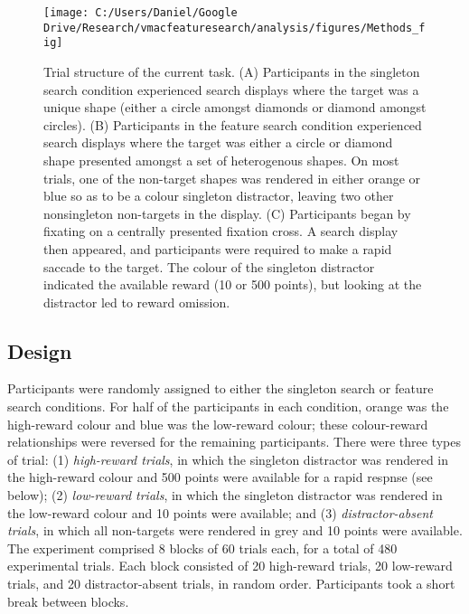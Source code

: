 \documentclass[jou, a4paper, noextraspace,floatsintext]{apa6}
\theoremstyle{definition}
\theoremstyle{definition}
\theoremstyle{definition}
\theoremstyle{remark}
\begin{document}
\begin{figure}

{\centering \texttt{[image: C:/Users/Daniel/Google Drive/Research/vmacfeaturesearch/analysis/figures/Methods\_fig]} 

}

\caption{Trial structure of the current task. (A) Participants in
the singleton search condition experienced search displays where the
target was a unique shape (either a circle amongst diamonds or diamond
amongst circles). (B) Participants in the feature search condition
experienced search displays where the target was either a circle or
diamond shape presented amongst a set of heterogenous shapes. On most
trials, one of the non-target shapes was rendered in either orange or
blue so as to be a colour singleton distractor, leaving two other
nonsingleton non-targets in the display. (C) Participants began by
fixating on a centrally presented fixation cross. A search display then
appeared, and participants were required to make a rapid saccade to the
target. The colour of the singleton distractor indicated the available
reward (10 or 500 points), but looking at the distractor led to reward
omission.}\label{fig:methodFig}
\end{figure}

\subsection{Design}\label{design}

Participants were randomly assigned to either the singleton search or
feature search conditions. For half of the participants in each
condition, orange was the high-reward colour and blue was the low-reward
colour; these colour-reward relationships were reversed for the
remaining participants. There were three types of trial: (1)
\emph{high-reward trials}, in which the singleton distractor was
rendered in the high-reward colour and 500 points were available for a
rapid respnse (see below); (2) \emph{low-reward trials}, in which the
singleton distractor was rendered in the low-reward colour and 10 points
were available; and (3) \emph{distractor-absent trials}, in which all
non-targets were rendered in grey and 10 points were available. The
experiment comprised 8 blocks of 60 trials each, for a total of 480
experimental trials. Each block consisted of 20 high-reward trials, 20
low-reward trials, and 20 distractor-absent trials, in random order.
Participants took a short break between blocks.
\end{document}
